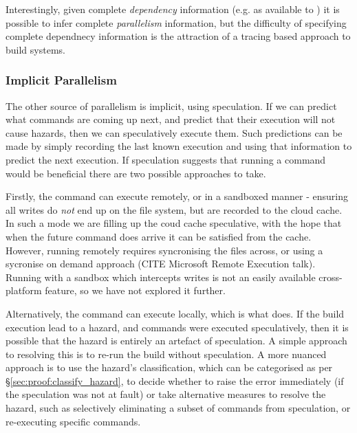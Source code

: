 Interestingly, given complete \emph{dependency} information (e.g. as available to \Make) it is possible to infer complete \emph{parallelism} information, but the difficulty of specifying complete dependnecy information is the attraction of a tracing based approach to build systems.

\subsubsection{Implicit Parallelism}
\label{sec:speculation}

The other source of parallelism is implicit, using speculation. If we can predict what commands are coming up next, and predict that their execution will not cause hazards, then we can speculatively execute them.  Such predictions can be made by simply recording the last known execution and using that information to predict the next execution.  If speculation suggests that running a command would be beneficial there are two possible approaches to take.

Firstly, the command can execute remotely, or in a sandboxed manner - ensuring all writes do \emph{not} end up on the file system, but are recorded to the cloud cache. In such a mode we are filling up the coud cache speculative, with the hope that when the future command does arrive it can be satisfied from the cache. However, running remotely requires syncronising the files across, or using a sycronise on demand approach (CITE Microsoft Remote Execution talk). Running with a sandbox which intercepts writes is not an easily available cross-platform feature, so we have not explored it further.

Alternatively, the command can execute locally, which is what \Rattle does. If the build execution lead to a hazard, and commands were executed speculatively, then it is possible that the hazard is entirely an artefact of speculation.  A simple approach to resolving this is to re-run the build without speculation.  A more nuanced approach is to use the hazard's classification, which can be categorised as per \S\ref{sec:proof:classify_hazard}, to decide whether to raise the error immediately (if the speculation was not at fault) or take alternative measures to resolve the hazard, such as selectively eliminating a subset of commands from speculation, or re-executing specific commands.




